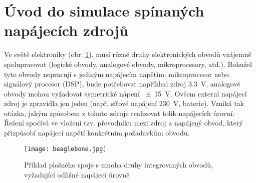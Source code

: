   \section{Úvod do simulace spínaných napájecích zdrojů}
    
    Ve světě elektroniky (obr. \ref{SPICE:Basso_intro}), musí různé druhy elektronických obvodů 
    vzájemně spolupracovat (logické obvody, analogové obvody, mikroprocesory, atd.). Bohužel tyto 
    obvody nepracují s jediným napájecím napětím: mikroprocesor nebo signálový procesor (DSP), bude 
    potřebovat například zdroj \qty{3.3}{\volt}, analogové obvody mohou vyžadovat symetrické nápení 
    \qty{\pm15}{\volt}. Ovšem externí napájecí zdroj je zpravidla jen jeden (např. síťové napájení 
    \qty{230}{\volt}, baterie). Vzniká tak otázka, jakým způsobem z tohoto zdroje realizovat tolik 
    napájecích úrovní. Řešení spočívá ve vložení tzv. převodníku mezi zdroj a napájený obvod, který 
    přizpůsobí napájecí napětí konkrétním požadavkům obvodu.
    
    \begin{figure}[ht!]
      \centering
      \texttt{[image: beaglebone.jpg]}
      \caption{Příklad plošného spoje s mnoha druhy integrovaných obvodů, vyžadující odlišné 
               napájecí úrovně}
      \label{SPICE:Basso_intro}
    \end{figure}

